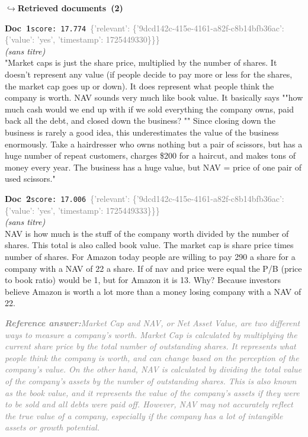 \documentclass[a4paper,11pt]{article}
\begin{document}
\noindent\hfill{\footnotesize\textcolor{doccolor}{\textbf{$\hookrightarrow$\enspace Retrieved documents~(2)}}}
\begin{docenv}
{\footnotesize\textcolor{doccolor}{\textbf{Doc~1}}}\hfill{\tiny\texttt{score:~17.774}}\ {\tiny\textcolor{gray}{\{'relevant': \{'9dcd142c-415e-4161-a82f-c8b14bfb36ac': \{'value': 'yes', 'timestamp': 1725449330\}\}\}}}\\[3pt]
{\small\textit{(sans titre)}}\\[2pt]
\vspace{2pt}
{\footnotesize 
"Market caps is just the share price, multiplied by the number of shares. It doesn't represent any value (if people decide to pay more or less for the shares, the market cap goes up or down). It does represent what people think the company is worth.  NAV sounds very much like book value. It basically says ""how much cash would we end up with if we sold everything the company owns, paid back all the debt, and closed down the business? "" Since closing down the business is rarely a good idea, this underestimates the value of the business enormously. Take a hairdresser who owns nothing but a pair of scissors, but has a huge number of repeat customers, charges \$200 for a haircut, and makes tons of money every year. The business has a huge value, but NAV = price of one pair of used scissors."}
\end{docenv}
\begin{docenv}
{\footnotesize\textcolor{doccolor}{\textbf{Doc~2}}}\hfill{\tiny\texttt{score:~17.006}}\ {\tiny\textcolor{gray}{\{'relevant': \{'9dcd142c-415e-4161-a82f-c8b14bfb36ac': \{'value': 'yes', 'timestamp': 1725449333\}\}\}}}\\[3pt]
{\small\textit{(sans titre)}}\\[2pt]
\vspace{2pt}
{\footnotesize 
NAV is  how much is the stuff of the company worth divided by the number of shares. This total is also called book value. The market cap is share price times number of shares. For Amazon  today people are willing to pay 290 a share for a company with a NAV of 22 a share. If of nav and price were equal the P/B (price to book ratio) would be 1, but for Amazon it is 13.  Why? Because investors believe Amazon is worth a lot more than a money losing company with a NAV of 22.}
\end{docenv}
\begin{refanswerenv}
{\footnotesize\textit{\textcolor{gray}{\textbf{Reference answer:}\enspace Market Cap and NAV, or Net Asset Value, are two different ways to measure a company's worth. Market Cap is calculated by multiplying the current share price by the total number of outstanding shares. It represents what people think the company is worth, and can change based on the perception of the company's value. On the other hand, NAV is calculated by dividing the total value of the company's assets by the number of outstanding shares. This is also known as the book value, and it represents the value of the company's assets if they were to be sold and all debts were paid off. However, NAV may not accurately reflect the true value of a company, especially if the company has a lot of intangible assets or growth potential.}}}
\end{refanswerenv}
\end{document}
